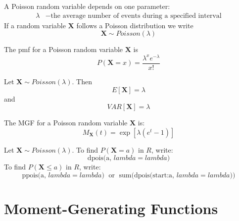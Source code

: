 \documentclass[12pt]{report}
\begin{document}
\begin{defn}{}{}
    A Poisson random variable depends on one parameter: \begin{align*}
        \lambda &- \text{the average number of events during a specified interval}
    \end{align*}
    If a random variable $\mathbf{X}$ follows a Poisson distribution we write $$\mathbf{X}\sim Poisson(\lambda)$$
\end{defn}

\begin{defn}{}{}
    The pmf for a Poisson random variable $\mathbf{X}$ is \begin{equation*}
        P(\mathbf{X} = x) = \frac{\lambda^xe^{-\lambda}}{x!}
    \end{equation*}
\end{defn}

\begin{defn}{}{}
    Let $\mathbf{X}\sim Poisson(\lambda)$. Then \begin{equation*}
        E[\mathbf{X}] = \lambda
    \end{equation*}
    and
    \begin{equation*}
        VAR[\mathbf{X}] = \lambda
    \end{equation*}
\end{defn}


\begin{defn}{}{}
    The MGF for a Poisson random variable $\mathbf{X}$ is: \begin{equation*}
        M_{\mathbf{X}}(t) = \operatorname{exp}[\lambda(e^t-1)]
    \end{equation*}
\end{defn}


\begin{defn}{}{}
    Let $\mathbf{X}\sim Poisson(\lambda)$. To find $P(\mathbf{X} = a)$ in $R$, write: \begin{equation*}
        \text{dpois(a, $lambda = lambda$)}
    \end{equation*}
    To find $P(\mathbf{X} \leq a)$ in $R$, write: \begin{equation*}
        \text{ppois(a, $lambda = lambda$)}\;\text{ or }\;\text{sum(dpois(start:a, $lambda = lambda$))}
    \end{equation*}
\end{defn}



\section{Moment-Generating Functions}
\end{document}

